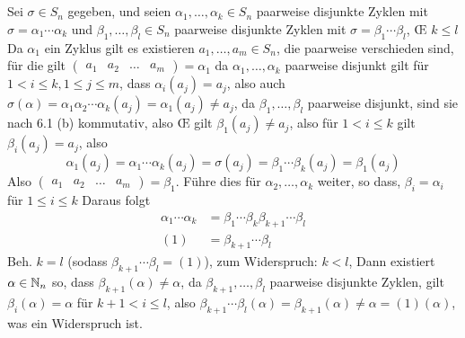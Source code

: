 \documentclass[sectionformat = aufgabe]{gadsescript}
\begin{document}
\subsection{}
Sei $ \sigma \in S_n $ gegeben, und seien $ \alpha_1, \dotsc, \alpha_k \in S_n $ paarweise disjunkte Zyklen mit $ \sigma = \alpha_1 \dotsb \alpha_k $ und $ \beta_1, \dotsc, \beta_l \in S_n $ paarweise disjunkte Zyklen mit $ \sigma = \beta_1 \dotsb \beta_l $, \OE{} $ k \leq  l $
Da $ \alpha_1 $ ein Zyklus gilt es existieren $ a_1, \dotsc, a_m \in S_n$, die paarweise verschieden sind, für die gilt $ \begin{pmatrix} a_1 & a_2 & \hdots & a_m \end{pmatrix} = \alpha_1 $
da $ \alpha_1, \dotsc, \alpha_k $ paarweise disjunkt gilt für $ 1 < i \leq k, 1 \leq j \leq m  $, dass $ \alpha_i (a_j) = a_j $, also auch
$ \sigma(\alpha) =  \alpha_1 \alpha_2 \dotsb \alpha_k (a_j) = \alpha_1(a_j) \neq a_j  $,
da $ \beta_1, \dotsc, \beta_{l}  $ paarweise disjunkt, sind sie nach 6.1 (b) kommutativ, also \OE{} gilt $ \beta_1(a_j) \neq a_j $, also für $ 1 < i \leq k $ gilt $ \beta_i(a_j) = a_j $, also
\[
	\alpha_1 (a_j) = \alpha_1 \dotsb \alpha_k (a_j) = \sigma (a_j) = \beta_1 \dotsb \beta_k (a_j) = \beta_1 (a_j) 
\]
Also $ \begin{pmatrix} a_1 & a_2 & \hdots & a_m \end{pmatrix} = \beta_1 $.
Führe dies für $ \alpha_2, \dotsc, \alpha_k $ weiter, so dass, $ \beta_i = \alpha_i $ für $ 1 \leq i \leq k $
Daraus folgt
\begin{align*}
	\alpha_1 \dotsb \alpha_k &= \beta_1 \dotsb \beta_k \beta_{k + 1} \dotsb \beta_l \\
	(1) &= \beta_{k + 1} \dotsb \beta_l
\end{align*}
Beh. $ k = l $ (sodass $ \beta_{k + 1} \dotsb \beta_l = (1) $), zum Widerspruch:
$ k < l $, Dann existiert $ \alpha \in \mathbb{N} _n $ so, dass $ \beta_{k + 1} (\alpha) \neq  \alpha $, da $ \beta_{k + 1} , \dotsc, \beta_l $ paarweise disjunkte Zyklen, gilt $ \beta_i (\alpha) = \alpha $ für $ k + 1 < i \leq l $, also
$ \beta_{k + 1} \dotsb \beta_l (\alpha) = \beta_{k + 1} (\alpha) \neq \alpha = (1) (\alpha) $, was ein Widerspruch ist.
\end{document}
